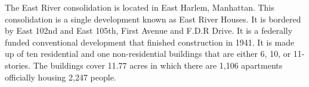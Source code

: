 

The East River consolidation is located in East Harlem, Manhattan. This consolidation is a single development known as East River Houses. It is bordered by East 102nd and East 105th, First Avenue and F.D.R Drive. It is a federally funded conventional development that finished construction in 1941. It is made up of ten residential and one non-residential buildings that are either 6, 10, or 11-stories. The buildings cover 11.77 acres in which there are 1,106 apartments officially housing 2,247 people. 